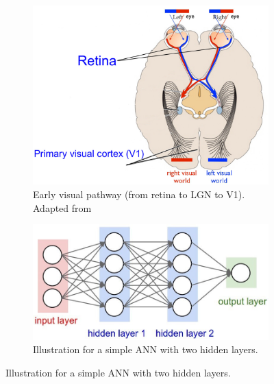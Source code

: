 \begin{figure}[H]
\centering
\begin{subfigure}[b]{0.5\textwidth}
\includegraphics[width=\textwidth]{figures/intro/visual-pathway.jpg}
    \caption{Early visual pathway (from retina to LGN to V1). Adapted from \cite{pillow_vision_2022}}
\end{subfigure}
\hfill
\begin{subfigure}[b]{0.45\textwidth}
      \includegraphics[width=\textwidth]{figures/intro/simple-ann.jpeg}
    \caption{Illustration for a simple ANN with two hidden layers.}
\end{subfigure}
\end{figure} 

